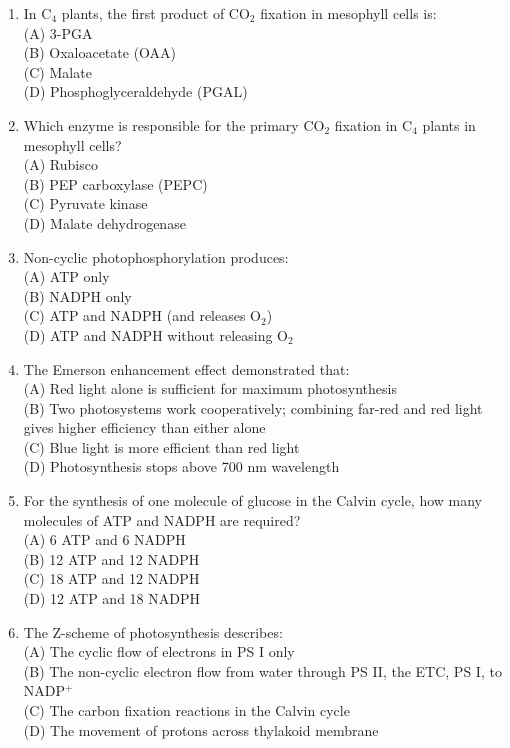 \documentclass{article}
\begin{document}
\begin{enumerate}[label=Q\arabic*.]
\item In C$_4$ plants, the first product of CO$_2$ fixation in mesophyll cells is:
\\(A) 3-PGA
\\(B) Oxaloacetate (OAA)
\\(C) Malate
\\(D) Phosphoglyceraldehyde (PGAL)

\item Which enzyme is responsible for the primary CO$_2$ fixation in C$_4$ plants in mesophyll cells?
\\(A) Rubisco
\\(B) PEP carboxylase (PEPC)
\\(C) Pyruvate kinase
\\(D) Malate dehydrogenase

\item Non-cyclic photophosphorylation produces:
\\(A) ATP only
\\(B) NADPH only
\\(C) ATP and NADPH (and releases O$_2$)
\\(D) ATP and NADPH without releasing O$_2$

\item The Emerson enhancement effect demonstrated that:
\\(A) Red light alone is sufficient for maximum photosynthesis
\\(B) Two photosystems work cooperatively; combining far-red and red light gives higher efficiency than either alone
\\(C) Blue light is more efficient than red light
\\(D) Photosynthesis stops above 700 nm wavelength

\item For the synthesis of one molecule of glucose in the Calvin cycle, how many molecules of ATP and NADPH are required?
\\(A) 6 ATP and 6 NADPH
\\(B) 12 ATP and 12 NADPH
\\(C) 18 ATP and 12 NADPH
\\(D) 12 ATP and 18 NADPH

\item The Z-scheme of photosynthesis describes:
\\(A) The cyclic flow of electrons in PS I only
\\(B) The non-cyclic electron flow from water through PS II, the ETC, PS I, to NADP$^+$
\\(C) The carbon fixation reactions in the Calvin cycle
\\(D) The movement of protons across thylakoid membrane


\end{enumerate}
\end{document}
